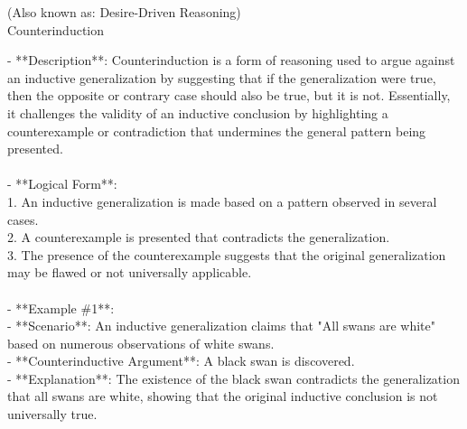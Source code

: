 \documentclass[a4paper,12pt,single,pdftex]{scrbook}
\begin{document}
  
    
      (Also known as: Desire-Driven Reasoning)
    \\

  

Counterinduction
    
      - **Description**: Counterinduction is a form of reasoning used to argue against an inductive generalization by suggesting that if the generalization were true, then the opposite or contrary case should also be true, but it is not. Essentially, it challenges the validity of an inductive conclusion by highlighting a counterexample or contradiction that undermines the general pattern being presented.
    \\

    
      
    \\

    
      - **Logical Form**:
    \\

    
        1. An inductive generalization is made based on a pattern observed in several cases.
    \\

    
        2. A counterexample is presented that contradicts the generalization.
    \\

    
        3. The presence of the counterexample suggests that the original generalization may be flawed or not universally applicable.
    \\

    
      
    \\

    
      - **Example \#1**:
    \\

    
        - **Scenario**: An inductive generalization claims that "All swans are white" based on numerous observations of white swans.
    \\

    
        - **Counterinductive Argument**: A black swan is discovered.
    \\

    
        - **Explanation**: The existence of the black swan contradicts the generalization that all swans are white, showing that the original inductive conclusion is not universally true.
    \\

    
      
\end{document}
